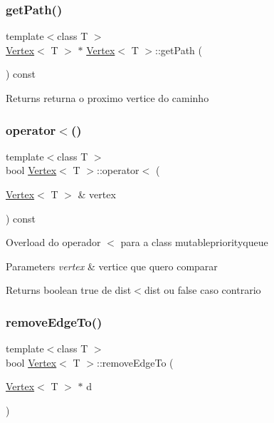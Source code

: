 \subsubsection{\texorpdfstring{get\+Path()}{getPath()}}
{\footnotesize\ttfamily template$<$class T $>$ \\
\mbox{\hyperlink{class_vertex}{Vertex}}$<$ T $>$ $\ast$ \mbox{\hyperlink{class_vertex}{Vertex}}$<$ T $>$\+::get\+Path (\begin{DoxyParamCaption}{ }\end{DoxyParamCaption}) const}

\begin{DoxyReturn}{Returns}
returna o proximo vertice do caminho 
\end{DoxyReturn}
\mbox{\label{class_vertex_a5a6670b842354232bac4dad2f551d66e}} 
\subsubsection{\texorpdfstring{operator$<$()}{operator<()}}
{\footnotesize\ttfamily template$<$class T $>$ \\
bool \mbox{\hyperlink{class_vertex}{Vertex}}$<$ T $>$\+::operator$<$ (\begin{DoxyParamCaption}\item[{\mbox{\hyperlink{class_vertex}{Vertex}}$<$ T $>$ \&}]{vertex }\end{DoxyParamCaption}) const}

Overload do operador $<$ para a class mutablepriorityqueue 
\begin{DoxyParams}{Parameters}
{\em vertex} & vertice que quero comparar \\
\hline
\end{DoxyParams}
\begin{DoxyReturn}{Returns}
boolean true de dist$<$dist ou false caso contrario 
\end{DoxyReturn}
\mbox{\label{class_vertex_ab2b5b43fb1709a901b78718436763a84}} 
\subsubsection{\texorpdfstring{remove\+Edge\+To()}{removeEdgeTo()}}
{\footnotesize\ttfamily template$<$class T $>$ \\
bool \mbox{\hyperlink{class_vertex}{Vertex}}$<$ T $>$\+::remove\+Edge\+To (\begin{DoxyParamCaption}\item[{\mbox{\hyperlink{class_vertex}{Vertex}}$<$ T $>$ $\ast$}]{d }\end{DoxyParamCaption})}

